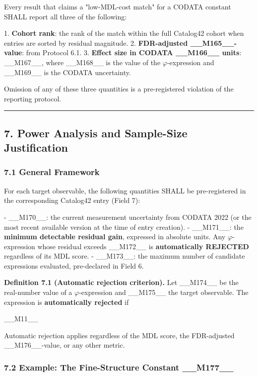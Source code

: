 Every result that claims a "low-MDL-cost match" for a CODATA constant SHALL report all three of the following:

1. \textbf{Cohort rank}: the rank of the match within the full Catalog42 cohort when entries are sorted by residual magnitude.
2. \textbf{FDR-adjusted \_\_M165\_\_-value}: from Protocol 6.1.
3. \textbf{Effect size in CODATA \_\_M166\_\_ units}: \_\_M167\_\_, where \_\_M168\_\_ is the value of the $\varphi$-expression and \_\_M169\_\_ is the CODATA uncertainty.

Omission of any of these three quantities is a pre-registered violation of the reporting protocol.

\noindent\rule{\textwidth}{0.4pt}

\subsection{7. Power Analysis and Sample-Size Justification}

\subsubsection{7.1 General Framework}

For each target observable, the following quantities SHALL be pre-registered in the corresponding Catalog42 entry (Field 7):

- \_\_M170\_\_: the current measurement uncertainty from CODATA 2022 (or the most recent available version at the time of entry creation).
- \_\_M171\_\_: the \textbf{minimum detectable residual gain}, expressed in absolute units. Any $\varphi$-expression whose residual exceeds \_\_M172\_\_ is \textbf{automatically REJECTED} regardless of its MDL score.
- \_\_M173\_\_: the maximum number of candidate expressions evaluated, pre-declared in Field 6.

\textbf{Definition 7.1 (Automatic rejection criterion).} Let \_\_M174\_\_ be the real-number value of a $\varphi$-expression and \_\_M175\_\_ the target observable. The expression is \textbf{automatically rejected} if

\_\_M11\_\_

Automatic rejection applies regardless of the MDL score, the FDR-adjusted \_\_M176\_\_-value, or any other metric.

\subsubsection{7.2 Example: The Fine-Structure Constant \_\_M177\_\_}

